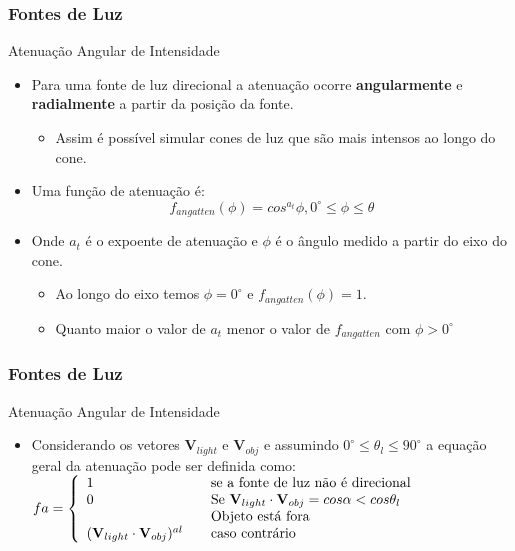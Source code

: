\documentclass{beamer}
\begin{document}
\begin{frame}
\frametitle{Fontes de Luz}

	\begin{block}{Atenuação Angular de Intensidade}
		\begin{itemize}
			\item Para uma fonte de luz direcional a atenuação ocorre \textbf{angularmente} e \textbf{radialmente} a partir da posição da fonte.
			\begin{itemize}
				\item Assim é possível simular cones de luz que são mais intensos ao longo do cone.
			\end{itemize}	
			\item Uma função de atenuação é:
				\begin{equation*}
					f_{angatten}(\phi) = cos^{a_t} \phi, 0^\circ \leq \phi \leq \theta
				\end{equation*}	
			\item Onde $a_t$ é o expoente de atenuação e $\phi$ é o ângulo medido a partir do eixo do cone.
			\begin{itemize}
				\item Ao longo do eixo temos $\phi = 0^\circ$ e $f_{angatten}(\phi) = 1$.
				\item Quanto maior o valor de $a_t$ menor o valor de $f_{angatten}$ com $\phi > 0^\circ$
\end{itemize}													 
		\end{itemize}
	\end{block}
	
\end{frame}

\begin{frame}
\frametitle{Fontes de Luz}

	\begin{block}{Atenuação Angular de Intensidade}
		\begin{itemize}
			\item Considerando os vetores $\textbf{V}_{light}$ e $\textbf{V}_{obj}$ e assumindo $0^\circ \leq \theta_l \leq 90^\circ$ a equação geral da atenuação pode ser definida como:							$fa = \left\{
					\begin{array}{l l}
   						 1 & \quad \text{se a fonte de luz não é direcional}\\
   						 0 & \quad \text{Se } \textbf{V}_{light} \cdot \textbf{V}_{obj} = cos \alpha < cos \theta_l\\
   						  & \quad \text{Objeto está fora}\\
    						(\textbf{V}_{light} \cdot \textbf{V}_{obj})^{al} & \quad \text{caso contrário}
  					\end{array} \right.$
		\end{itemize}
	\end{block}
	
\end{frame}
\end{document}
